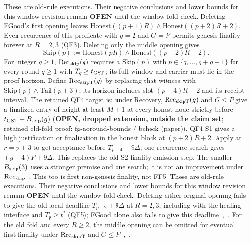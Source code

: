 \documentclass{article}
\theoremstyle{plain}
\theoremstyle{definition}
\theoremstyle{remark}
\newcommand{\OPEN}{\textbf{OPEN}}
\begin{document}
These are old-rule executions.  Their negative conclusions and lower
bounds for this window revision remain \OPEN{} until the window-fold check.
Deleting FGood's first opening leaves
$\mathrm{Honest}((p+1)R)\land\mathrm{Honest}((p+2)R+2)$.
Even recurrence of this predicate with $g=2$ and $G=P$ permits
genesis finality forever at $R=2,3$ (QF3).
Deleting only the middle opening gives
\[
 \mathrm{Skip}(p):=\mathrm{Honest}(pR)
                    \land\mathrm{Honest}((p+2)R+2).
\]
For integer $g\geq1$, $\mathrm{Rec}_{\rm skip}(g)$ requires a
$\mathrm{Skip}(p)$ with $p\in\{q,\ldots,q+g-1\}$ for every round
$q\geq1$ with $T_q\geq t_{\rm GST}$; its full window and carrier must lie
in the proof horizon.  Define $\mathrm{Rec}_{\rm skipT}(g)$ by replacing
that witness with $\mathrm{Skip}(p)\land\mathrm{Tail}(p+3)$; its horizon
includes slot $(p+4)R+2$ and its receipt interval.
The retained QF4 target is: under Recovery, $\mathrm{Rec}_{\rm skipT}(g)$ and $G\leq P$ give a
finalized entry of height at least $M+1$ at every honest node strictly
before $t_{\rm GST}+B_{\rm skip}(g)$ (\textbf{OPEN, dropped extension, outside the claim set}; retained old-fold
proof: fg-noround-bounds / bcheck (paper)).
QF4 S1 gives a high justification or finalization in the honest block at
$(p+2)R+2$.  Apply  at $r=p+3$ to get acceptance before
$T_{p+4}+9\Delta$; one recurrence search gives $(g+4)P+9\Delta$.
This replaces the old S2 finality-emission step.
The smaller $B_{\rm skip}(3)$ uses a stronger premise and one search;
it is not an improvement under $\mathrm{Rec}_{\rm skip}$~\cite[\S3]{NRB}.
This too is first non-genesis finality, not FF5.
These are old-rule executions.  Their negative conclusions and lower
bounds for this window revision remain \OPEN{} until the window-fold check.
Deleting either original opening fails to give the old local deadline
$T_{p+2}+9\Delta$ at $R=2,3$, including with the healing interface and
$T_p\geq t^*$ (QF5); FGood alone also fails to give this deadline~\cite[\S A]{NRBC},~\cite[\S2]{NRB}.
For the old fold and every $R\geq2$, the middle opening can be omitted
for eventual first finality under $\mathrm{Rec}_{\rm skipT}$ and $G\leq P$~\cite[QF3--QF5, N6--N7]{BPF},~\cite{NRB,NRBC,QF181,QFR}.
\end{document}

